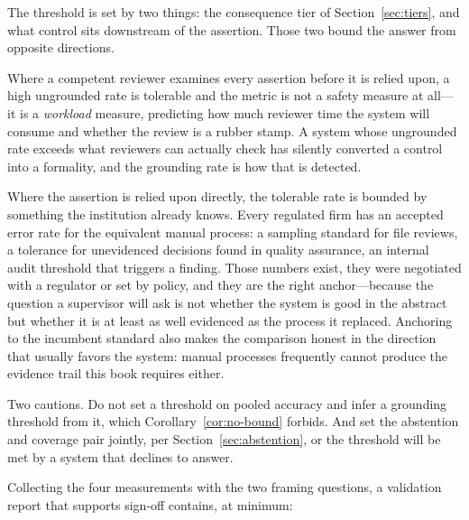 The threshold is set by two things: the consequence tier of
Section~\ref{sec:tiers}, and what control sits downstream of the assertion. Those two
bound the answer from opposite directions.

Where a competent reviewer examines every assertion before it is relied upon, a high
ungrounded rate is tolerable and the metric is not a safety measure at all---it is a
\emph{workload} measure, predicting how much reviewer time the system will consume and
whether the review is a rubber stamp. A system whose ungrounded rate exceeds what
reviewers can actually check has silently converted a control into a formality, and the
grounding rate is how that is detected.

Where the assertion is relied upon directly, the tolerable rate is bounded by something
the institution already knows. Every regulated firm has an accepted error rate for the
equivalent manual process: a sampling standard for file reviews, a tolerance for
unevidenced decisions found in quality assurance, an internal audit threshold that
triggers a finding. Those numbers exist, they were negotiated with a regulator or set by
policy, and they are the right anchor---because the question a supervisor will ask is not
whether the system is good in the abstract but whether it is at least as well evidenced
as the process it replaced. Anchoring to the incumbent standard also makes the comparison
honest in the direction that usually favors the system: manual processes frequently
cannot produce the evidence trail this book requires either.

Two cautions. Do not set a threshold on pooled accuracy and infer a grounding threshold
from it, which Corollary~\ref{cor:no-bound} forbids. And set the abstention and coverage
pair jointly, per Section~\ref{sec:abstention}, or the threshold will be met by a system
that declines to answer.

Collecting the four measurements with the two framing questions, a validation report
that supports sign-off contains, at minimum:

